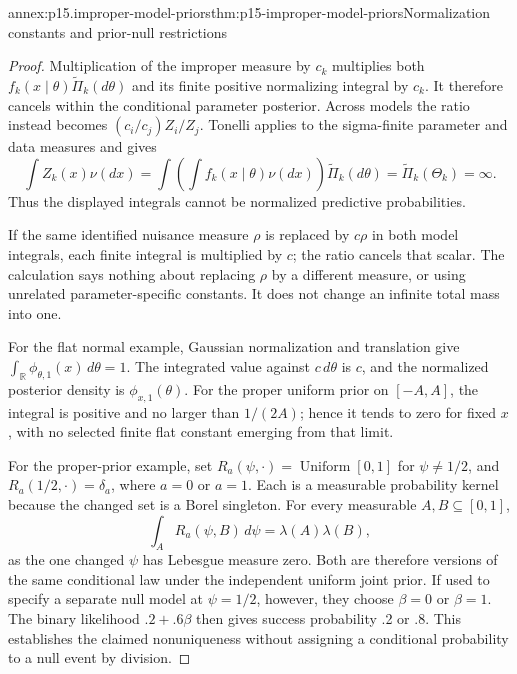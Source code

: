 \begin{annexitem}{annex:p15.improper-model-priors}{thm:p15-improper-model-priors}{Normalization constants and prior-null restrictions}
\begin{proof}
Multiplication of the improper measure by \(c_k\) multiplies both
\(f_k(x\mid\theta)\widetilde\Pi_k(d\theta)\) and its finite positive
normalizing integral by \(c_k\). It therefore cancels within the
conditional parameter posterior. Across models the ratio instead becomes
\((c_i/c_j)Z_i/Z_j\). Tonelli applies to the sigma-finite parameter
and data measures and gives
\[
 \int Z_k(x)\nu(dx)
 =\int\left(\int f_k(x\mid\theta)\nu(dx)\right)\widetilde\Pi_k(d\theta)
 =\widetilde\Pi_k(\Theta_k)=\infty.
\]
Thus the displayed integrals cannot be normalized predictive probabilities.

If the same identified nuisance measure \(\rho\) is replaced by \(c\rho\)
in both model integrals, each finite integral is multiplied by \(c\);
the ratio cancels that scalar. The calculation says nothing about replacing
\(\rho\) by a different measure, or using unrelated parameter-specific
constants. It does not change an infinite total mass into one.

For the flat normal example, Gaussian normalization and translation give
\(\int_{\mathbb R}\phi_{\theta,1}(x)\,d\theta=1\).
The integrated value against \(c\,d\theta\) is \(c\), and the normalized
posterior density is \(\phi_{x,1}(\theta)\). For the proper uniform prior
on \([-A,A]\), the integral is positive and no larger than \(1/(2A)\);
hence it tends to zero for fixed \(x\), with no selected finite flat
constant emerging from that limit.

For the proper-prior example, set
\(R_a(\psi,\cdot)=\operatorname{Uniform}[0,1]\) for
\(\psi\ne1/2\), and \(R_a(1/2,\cdot)=\delta_a\), where \(a=0\)
or \(a=1\). Each is a measurable probability kernel because the changed
set is a Borel singleton. For every measurable \(A,B\subseteq[0,1]\),
\[
 \int_A R_a(\psi,B)\,d\psi
 =\lambda(A)\lambda(B),
\]
as the one changed \(\psi\) has Lebesgue measure zero. Both are therefore
versions of the same conditional law under the independent uniform joint
prior. If used to specify a separate null model at \(\psi=1/2\), however,
they choose \(\beta=0\) or \(\beta=1\). The binary likelihood
\(.2+.6\beta\) then gives success probability .2 or .8. This establishes
the claimed nonuniqueness without assigning a conditional probability
to a null event by division.
\end{proof}
\end{annexitem}

